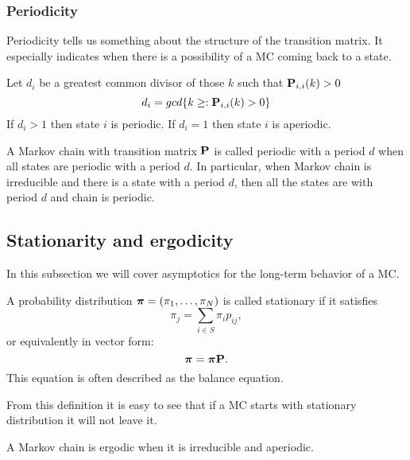 	\subsubsection{Periodicity}
		Periodicity tells us something about the structure of the transition matrix. It especially indicates when there is a possibility of a MC coming back to a state.
		\begin{definition}[Periodicity]
			Let $d_i$ be a greatest common divisor of those $k$ such that $\mathbf{P}_{i,i}(k)>0$ \ie
			\begin{equation*}
				d_i = gcd\{ k \geq : \mathbf{P}_{i,i}(k)>0 \}
			\end{equation*}
			If $d_i > 1$ then state $i$ is periodic. If $d_i = 1$ then state $i$ is aperiodic.
		\end{definition}
	
		\begin{definition}
			A Markov chain with transition matrix $\mathbf{P}$ is called periodic with a period $d$ when all states are periodic with a period $d$. In particular, when Markov chain is irreducible and there is a state with a period $d$, then all the states are with period $d$ and chain is periodic.
		\end{definition}	
	

\subsection{Stationarity and ergodicity}
	In this subsection we will cover asymptotics for the long-term behavior of a MC.
	\begin{definition}[Stationarity]
		A probability distribution $\boldsymbol{\pi} = (\pi_1, \ldots, \pi_N)$ is called stationary if it satisfies
		\begin{equation*}
			\pi_j = \sum_{i \in S} \pi_i p_{ij},
		\end{equation*}
		or equivalently in vector form:
		\begin{equation*}
			\boldsymbol{\pi} = \boldsymbol{\pi} \mathbf{P}.
		\end{equation*}
		This equation is often described as the balance equation.
	\end{definition}
	From this definition it is easy to see that if a MC starts with stationary distribution it will not leave it. 
	
	\begin{definition}[Ergodicity]
		A Markov chain is ergodic when it is irreducible and aperiodic.
	\end{definition}
	
